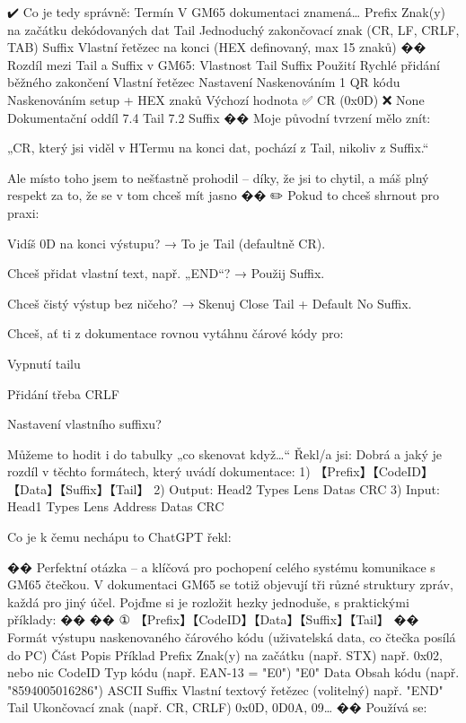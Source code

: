 ✔️ Co je tedy správně:
Termín	V GM65 dokumentaci znamená…
Prefix	Znak(y) na začátku dekódovaných dat
Tail	Jednoduchý zakončovací znak (CR, LF, CRLF, TAB)
Suffix	Vlastní řetězec na konci (HEX definovaný, max 15 znaků)
�� Rozdíl mezi Tail a Suffix v GM65:
Vlastnost	Tail	Suffix
Použití	Rychlé přidání běžného zakončení	Vlastní řetězec
Nastavení	Naskenováním 1 QR kódu	Naskenováním setup + HEX znaků
Výchozí hodnota	✅ CR (0x0D)	❌ None
Dokumentační oddíl	7.4 Tail	7.2 Suffix
�� Moje původní tvrzení mělo znít:

    „CR, který jsi viděl v HTermu na konci dat, pochází z Tail, nikoliv z Suffix.“

Ale místo toho jsem to nešťastně prohodil – díky, že jsi to chytil, a máš plný respekt za to, že se v tom chceš mít jasno ��
✏️ Pokud to chceš shrnout pro praxi:

    Vidíš 0D na konci výstupu? → To je Tail (defaultně CR).

    Chceš přidat vlastní text, např. „END“? → Použij Suffix.

    Chceš čistý výstup bez ničeho? → Skenuj Close Tail + Default No Suffix.

Chceš, ať ti z dokumentace rovnou vytáhnu čárové kódy pro:

    Vypnutí tailu

    Přidání třeba CRLF

    Nastavení vlastního suffixu?

Můžeme to hodit i do tabulky „co skenovat když…“
Řekl/a jsi:
Dobrá a jaký je rozdíl v těchto formátech, který uvádí dokumentace:
1) 【Prefix】【CodeID】【Data】【Suffix】【Tail】
2) Output: {Head2} {Types} {Lens} {Datas} {CRC}
3) Input: {Head1} {Types} {Lens} {Address} {Datas} {CRC}

Co je k čemu nechápu to
ChatGPT řekl:

�� Perfektní otázka – a klíčová pro pochopení celého systému komunikace s GM65 čtečkou.
V dokumentaci GM65 se totiž objevují tři různé struktury zpráv, každá pro jiný účel.
Pojďme si je rozložit hezky jednoduše, s praktickými příklady:
�� �� ① 【Prefix】【CodeID】【Data】【Suffix】【Tail】
�� Formát výstupu naskenovaného čárového kódu (uživatelská data, co čtečka posílá do PC)
Část	Popis	Příklad
Prefix	Znak(y) na začátku (např. STX)	např. 0x02, nebo nic
CodeID	Typ kódu (např. EAN-13 = "E0")	"E0"
Data	Obsah kódu (např. "8594005016286")	ASCII
Suffix	Vlastní textový řetězec (volitelný)	např. "END"
Tail	Ukončovací znak (např. CR, CRLF)	0x0D, 0D0A, 09…
�� Používá se:


